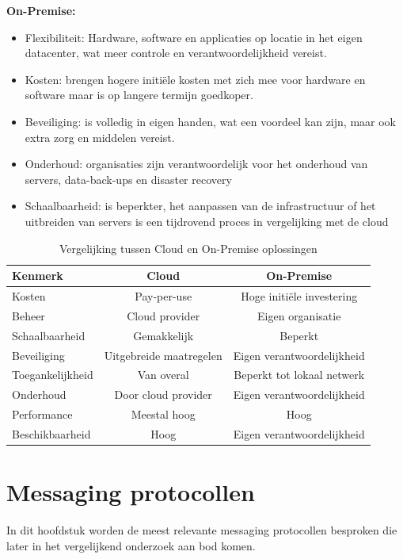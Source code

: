 \textbf{On-Premise:}
  \begin{itemize}
    \item Flexibiliteit: Hardware, software en applicaties op locatie in het eigen datacenter, wat meer controle en verantwoordelijkheid vereist.
    \item Kosten: brengen hogere initiële kosten met zich mee voor hardware en software maar is op langere termijn goedkoper.
    \item Beveiliging: is volledig in eigen handen, wat een voordeel kan zijn, maar ook extra zorg en middelen vereist.
    \item Onderhoud: organisaties zijn verantwoordelijk voor het onderhoud van servers, data-back-ups en disaster recovery
    \item Schaalbaarheid: is beperkter, het aanpassen van de infrastructuur of het uitbreiden van servers is een tijdrovend proces in vergelijking met de cloud
  \end{itemize}
   
\begin{table}[!h]
  \centering
  \begin{tabular}{lcc}
    \toprule Kenmerk & Cloud & On-Premise \\
    \midrule Kosten & Pay-per-use & Hoge initiële investering \\
    Beheer & Cloud provider & Eigen organisatie \\
    Schaalbaarheid & Gemakkelijk & Beperkt \\
    Beveiliging & Uitgebreide maatregelen & Eigen verantwoordelijkheid \\
    Toegankelijkheid & Van overal & Beperkt tot lokaal netwerk \\
    Onderhoud & Door cloud provider & Eigen verantwoordelijkheid \\
    Performance & Meestal hoog & Hoog \\
    Beschikbaarheid & Hoog & Eigen verantwoordelijkheid \\
    \bottomrule
  \end{tabular}
  \caption{\label{tab:cloud_vs_onpremise}Vergelijking tussen Cloud en On-Premise oplossingen\autocite{Golec2021}}
\end{table}

\section{Messaging protocollen}
In dit hoofdstuk worden de meest relevante messaging protocollen besproken die later in het vergelijkend onderzoek aan bod komen.

